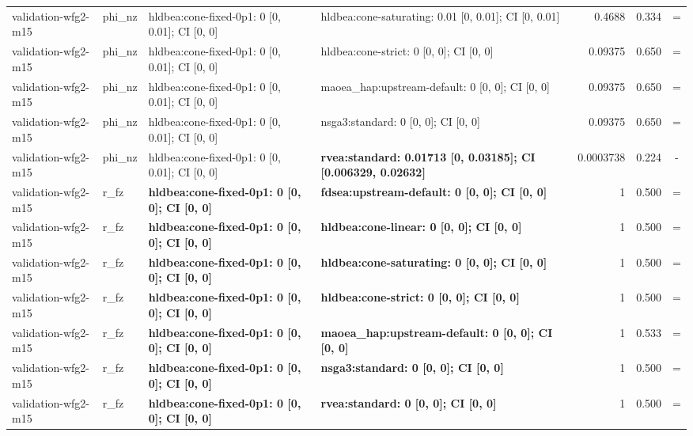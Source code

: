\begin{tabular}{llllrrc}
validation-wfg2-m15 & phi\_nz & hldbea:cone-fixed-0p1: 0 [0, 0.01]; CI [0, 0] & hldbea:cone-saturating: 0.01 [0, 0.01]; CI [0, 0.01] & 0.4688 & 0.334 & = \\
validation-wfg2-m15 & phi\_nz & hldbea:cone-fixed-0p1: 0 [0, 0.01]; CI [0, 0] & hldbea:cone-strict: 0 [0, 0]; CI [0, 0] & 0.09375 & 0.650 & = \\
validation-wfg2-m15 & phi\_nz & hldbea:cone-fixed-0p1: 0 [0, 0.01]; CI [0, 0] & maoea\_hap:upstream-default: 0 [0, 0]; CI [0, 0] & 0.09375 & 0.650 & = \\
validation-wfg2-m15 & phi\_nz & hldbea:cone-fixed-0p1: 0 [0, 0.01]; CI [0, 0] & nsga3:standard: 0 [0, 0]; CI [0, 0] & 0.09375 & 0.650 & = \\
validation-wfg2-m15 & phi\_nz & hldbea:cone-fixed-0p1: 0 [0, 0.01]; CI [0, 0] & \textbf{rvea:standard: 0.01713 [0, 0.03185]; CI [0.006329, 0.02632]} & 0.0003738 & 0.224 & - \\
validation-wfg2-m15 & r\_fz & \textbf{hldbea:cone-fixed-0p1: 0 [0, 0]; CI [0, 0]} & \textbf{fdsea:upstream-default: 0 [0, 0]; CI [0, 0]} & 1 & 0.500 & = \\
validation-wfg2-m15 & r\_fz & \textbf{hldbea:cone-fixed-0p1: 0 [0, 0]; CI [0, 0]} & \textbf{hldbea:cone-linear: 0 [0, 0]; CI [0, 0]} & 1 & 0.500 & = \\
validation-wfg2-m15 & r\_fz & \textbf{hldbea:cone-fixed-0p1: 0 [0, 0]; CI [0, 0]} & \textbf{hldbea:cone-saturating: 0 [0, 0]; CI [0, 0]} & 1 & 0.500 & = \\
validation-wfg2-m15 & r\_fz & \textbf{hldbea:cone-fixed-0p1: 0 [0, 0]; CI [0, 0]} & \textbf{hldbea:cone-strict: 0 [0, 0]; CI [0, 0]} & 1 & 0.500 & = \\
validation-wfg2-m15 & r\_fz & \textbf{hldbea:cone-fixed-0p1: 0 [0, 0]; CI [0, 0]} & \textbf{maoea\_hap:upstream-default: 0 [0, 0]; CI [0, 0]} & 1 & 0.533 & = \\
validation-wfg2-m15 & r\_fz & \textbf{hldbea:cone-fixed-0p1: 0 [0, 0]; CI [0, 0]} & \textbf{nsga3:standard: 0 [0, 0]; CI [0, 0]} & 1 & 0.500 & = \\
validation-wfg2-m15 & r\_fz & \textbf{hldbea:cone-fixed-0p1: 0 [0, 0]; CI [0, 0]} & \textbf{rvea:standard: 0 [0, 0]; CI [0, 0]} & 1 & 0.500 & = \\
\bottomrule
\end{tabular}
